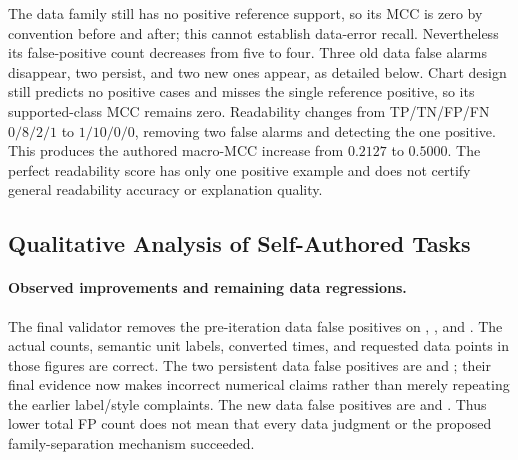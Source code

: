 \documentclass[11pt]{article}
\begin{document}
The data family still has no positive reference support, so its MCC is
zero by convention before and after; this cannot establish data-error
recall. Nevertheless its false-positive count decreases from five to
four. Three old data false alarms disappear, two persist, and two new
ones appear, as detailed below. Chart design still predicts no positive
cases and misses the single reference positive, so its supported-class
MCC remains zero. Readability changes from TP/TN/FP/FN $0/8/2/1$ to
$1/10/0/0$, removing two false alarms and detecting the one positive.
This produces the authored macro-MCC increase from $0.2127$ to $0.5000$.
The perfect readability score has only one positive example and does
not certify general readability accuracy or explanation quality.

\subsection{Qualitative Analysis of Self-Authored Tasks}

\paragraph{Observed improvements and remaining data regressions.}
The final validator removes the pre-iteration data false positives on
,
, and
.
The actual counts, semantic unit labels, converted times, and requested
data points in those figures are correct. The two persistent data false
positives are  and
; their final evidence now makes
incorrect numerical claims rather than merely repeating the earlier
label/style complaints. The new data false positives are
 and
.
Thus lower total FP count does not mean that every data judgment or
the proposed family-separation mechanism succeeded.
\end{document}
